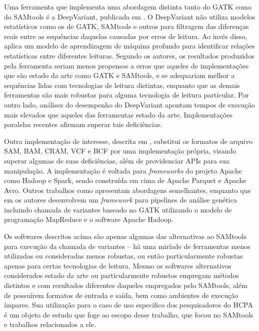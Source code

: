 \documentclass[cic,tc]{iiufrgs}
\begin{document}

Uma ferramenta que implementa uma abordagem distinta tanto do GATK como do
SAMtools é a DeepVariant, publicada em \cite{poplin2018universal}. O DeepVariant
não utiliza modelos estatísticos como os de GATK, SAMtools e outros para
filtragem das diferenças reais entre as sequências daquelas causadas por erros
de leitura. Ao invés disso, aplica um modelo de aprendizagem de máquina
profundo para identificar relações estatísticas entre diferentes leituras.
Segundo os autores, os resultados produzidos pela ferramenta seriam menos
propensos a erros que aqueles de implementações que são estado da arte como
GATK e SAMtools, e se adequariam melhor a sequências lidas com tecnologias de
leitura distintas, enquanto que as demais ferramentas são mais robustas para
alguma tecnologia de leitura particular. Por outro lado, análises do desempenho
do DeepVariant apontam tempos de execução mais elevados que aqueles das
ferramentas estado da arte. Implementações paralelas recentes afirmam superar
tais deficiências. \cite{ahmad2021vc}

Outra implementação de interesse, descrita em \cite{massie2013adam}, substitui
os formatos de arquivo SAM, BAM, CRAM, VCF e BCF por uma implementação própria,
visando superar algumas de suas deficiências, além de providenciar APIs para
sua manipulação. A implementação é voltada para \textit{frameworks} do projeto Apache
como Hadoop e Spark, sendo construída em cima de Apache Parquet e Apache Avro.
Outros trabalhos como \cite{boufea2017managing} apresentam abordagens
semelhantes, enquanto que em \cite{decap2015halvade} os autores desenvolvem um
\textit{framework} para pipelines de análise genética incluindo chamada de variantes
baseado no GATK utilizando o modelo de programação MapReduce e o software
Apache Hadoop.

Os softwares descritos acima são apenas algumas das alternativas ao SAMtools
para execução da chamada de variantes -- há uma miríade de ferramentas menos
utilizadas ou consideradas menos robustas, ou então particularmente robustas
apenas para certas tecnologias de leitura. Mesmo os softwares alternativos
considerados estado da arte ou particularmente robustos empregam métodos
distintos e com resultados diferentes daqueles empregados pelo SAMtools, além
de possuírem formatos de entrada e saída, bem como ambientes de execução
ímpares. Sua utilização para o caso de uso específico dos pesquisadores do HCPA
é um objeto de estudo que foge ao escopo desse trabalho, que focou no SAMtools
e trabalhos relacionados a ele.
\end{document}
